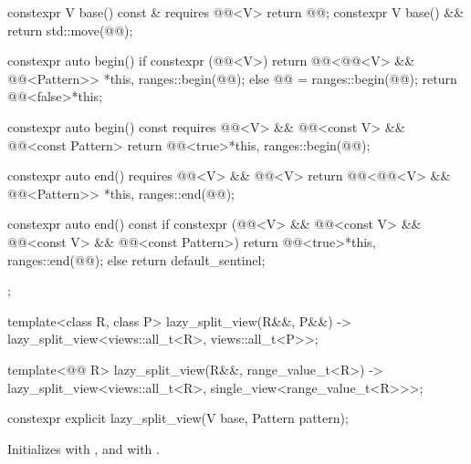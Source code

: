 \begin{codeblock}
{{    constexpr V base() const & requires @@<V> { return @@; }
    constexpr V base() && { return std::move(@@); }

    constexpr auto begin() {
      if constexpr (@@<V>) {
        return @@<@@<V> && @@<Pattern>>
          {*this, ranges::begin(@@)};
      } else {
        @@ = ranges::begin(@@);
        return @@<false>{*this};
      }
    }

    constexpr auto begin() const requires @@<V> && @@<const V> &&
                                          @@<const Pattern> {
      return @@<true>{*this, ranges::begin(@@)};
    }

    constexpr auto end() requires @@<V> && @@<V> {
      return @@<@@<V> && @@<Pattern>>
        {*this, ranges::end(@@)};
    }

    constexpr auto end() const {
      if constexpr (@@<V> && @@<const V> && @@<const V> &&
                    @@<const Pattern>)
        return @@<true>{*this, ranges::end(@@)};
      else
        return default_sentinel;
    }
  };

  template<class R, class P>
    lazy_split_view(R&&, P&&) -> lazy_split_view<views::all_t<R>, views::all_t<P>>;

  template<@@ R>
    lazy_split_view(R&&, range_value_t<R>)
      -> lazy_split_view<views::all_t<R>, single_view<range_value_t<R>>>;
}
\end{codeblock}

%
\begin{itemdecl}
constexpr explicit lazy_split_view(V base, Pattern pattern);
\end{itemdecl}

\begin{itemdescr}
\pnum
\effects
Initializes  with , and
 with .
\end{itemdescr}

